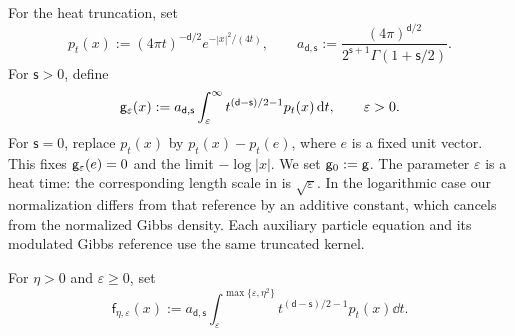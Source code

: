 \documentclass[11pt,reqno]{amsart}
\numberwithin{equation}{section}
\theoremstyle{plain}
\theoremstyle{remark}
\renewcommand{\d}{\mathsf{d}}\newcommand{\s}{\mathsf{s}}
\begin{document}
For the heat truncation, set
\begin{equation}\label{eq:heat-normalization}
 p_t(x):=(4\pi t)^{-\d/2}e^{-|x|^2/(4t)},\qquad
 a_{\d,\s}:=\frac{(4\pi)^{\d/2}}{2^{\s+1}\Gamma(1+\s/2)}.
\end{equation}
For $\s>0$, define
\begin{equation}\label{eq:heat-cutoff}
 \g_\varepsilon(x):=a_{\d,\s}\int_\varepsilon^\infty
             t^{(\d-\s)/2-1}p_t(x)\dd t,
             \qquad \varepsilon>0.
\end{equation}
For $\s=0$, replace $p_t(x)$ by $p_t(x)-p_t(e)$, where $e$ is a fixed unit vector. This fixes $\mathsf g_\varepsilon(e)=0$ and the limit $-\log|x|$. We set $\mathsf g_0:=\mathsf g$. The parameter $\varepsilon$ is a heat time: the corresponding length scale in \cite[Section~4.1]{DGRpartition} is $\sqrt\varepsilon$. In the logarithmic case our normalization differs from that reference by an additive constant, which cancels from the normalized Gibbs density. Each auxiliary particle equation and its modulated Gibbs reference use the same truncated kernel.

For $\eta>0$ and $\varepsilon\ge0$, set
\begin{equation}\label{eq:heat-short-range}
 \mathsf f_{\eta,\varepsilon}(x):=
 a_{\d,\s}\int_\varepsilon^{\max\{\varepsilon,\eta^2\}}
                   t^{(\d-\s)/2-1}p_t(x)\dd t.
\end{equation}
\end{document}
